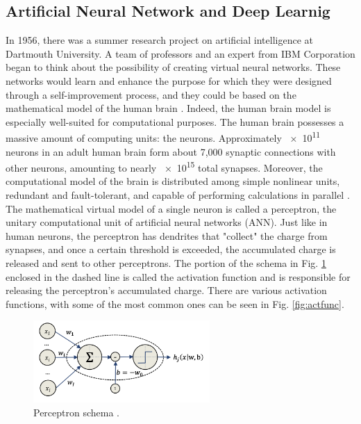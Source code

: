 



\subsection{Artificial Neural Network and Deep Learnig}
\label{subsec:deepl}
In 1956, there was a summer research project on artificial intelligence at Dartmouth University. A team of professors and an expert from IBM Corporation began to think about the possibility of creating virtual neural networks. These networks would learn and enhance the purpose for which they were designed through a self-improvement process, and they could be based on the mathematical model of the human brain \cite{mccarthy_proposal_1955}. Indeed, the human brain model is especially well-suited for computational purposes. The human brain possesses a massive amount of computing units: the neurons. Approximately \num{e11} neurons in an adult human brain form about 7,000 synaptic connections with other neurons, amounting to nearly \num{e15} total synapses. Moreover, the computational model of the brain is distributed among simple nonlinear units, redundant and fault-tolerant, and capable of performing calculations in parallel \cite{matteo_matteucci_perceptrons_2021}. The mathematical virtual model of a single neuron is called a perceptron, the unitary computational unit of artificial neural networks (ANN). Just like in human neurons, the perceptron has dendrites that "collect" the charge from synapses, and once a certain threshold is exceeded, the accumulated charge is released and sent to other perceptrons. The portion of the schema in Fig. \ref{fig:perceptron} enclosed in the dashed line is called the activation function and is responsible for releasing the perceptron's accumulated charge. There are various activation functions, with some of the most common ones can be seen in Fig. \ref{fig:actfunc}.
\begin{figure}
    \centering
    \includegraphics[width=0.6\textwidth]{Images/neurone.png}
    \caption[Perceptron schema]{Perceptron schema \cite{matteo_matteucci_perceptrons_2021}.}
    \label{fig:perceptron}
\end{figure}
